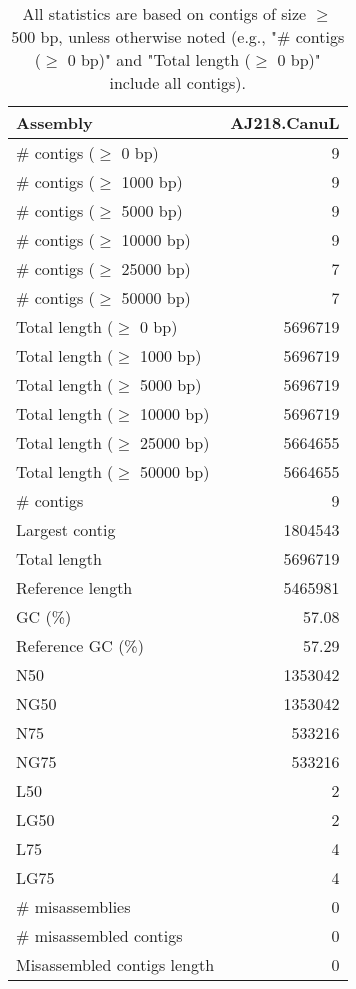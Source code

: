 \documentclass[12pt,a4paper]{article}
\begin{document}
\begin{table}[ht]
\begin{center}
\caption{All statistics are based on contigs of size $\geq$ 500 bp, unless otherwise noted (e.g., "\# contigs ($\geq$ 0 bp)" and "Total length ($\geq$ 0 bp)" include all contigs).}
\begin{tabular}{|l*{1}{|r}|}
\hline
Assembly & AJ218.CanuL \\ \hline
\# contigs ($\geq$ 0 bp) & 9 \\ \hline
\# contigs ($\geq$ 1000 bp) & 9 \\ \hline
\# contigs ($\geq$ 5000 bp) & 9 \\ \hline
\# contigs ($\geq$ 10000 bp) & 9 \\ \hline
\# contigs ($\geq$ 25000 bp) & 7 \\ \hline
\# contigs ($\geq$ 50000 bp) & 7 \\ \hline
Total length ($\geq$ 0 bp) & 5696719 \\ \hline
Total length ($\geq$ 1000 bp) & 5696719 \\ \hline
Total length ($\geq$ 5000 bp) & 5696719 \\ \hline
Total length ($\geq$ 10000 bp) & 5696719 \\ \hline
Total length ($\geq$ 25000 bp) & 5664655 \\ \hline
Total length ($\geq$ 50000 bp) & 5664655 \\ \hline
\# contigs & 9 \\ \hline
Largest contig & 1804543 \\ \hline
Total length & 5696719 \\ \hline
Reference length & 5465981 \\ \hline
GC (\%) & 57.08 \\ \hline
Reference GC (\%) & 57.29 \\ \hline
N50 & 1353042 \\ \hline
NG50 & 1353042 \\ \hline
N75 & 533216 \\ \hline
NG75 & 533216 \\ \hline
L50 & 2 \\ \hline
LG50 & 2 \\ \hline
L75 & 4 \\ \hline
LG75 & 4 \\ \hline
\# misassemblies & 0 \\ \hline
\# misassembled contigs & 0 \\ \hline
Misassembled contigs length & 0 \\ \hline

\end{tabular}
\end{center}
\end{table}
\end{document}
